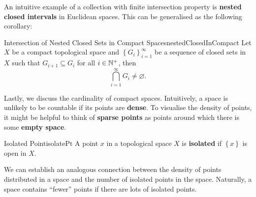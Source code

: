 \documentclass[math]{amznotes}
\theoremstyle{remark}
\begin{document}
An intuitive example of a collection with finite intersection property is \textbf{nested closed intervals} in Euclidean spaces. This can be generalised as the following corollary:
\begin{corbox}{Intersection of Nested Closed Sets in Compact Spaces}{nestedClosedInCompact}
    Let $X$ be a compact topological space and $\left\{G_i\right\}_{i = 1}^{\infty}$ be a sequence of closed sets in $X$ such that $G_{i + 1} \subseteq G_i$ for all $i \in \mathbb{N}^+$, then 
    \begin{equation*}
        \bigcap_{i = 1}^{\infty}G_i \neq \varnothing.
    \end{equation*}
\end{corbox}
Lastly, we discuss the cardinality of compact spaces. Intuitively, a space is unlikely to be countable if its points are \textbf{dense}. To visualise the density of points, it might be helpful to think of \textbf{sparse points} as points around which there is some \textbf{empty space}.
\begin{dfnbox}{Isolated Point}{isolatePt}
    A point $x$ in a topological space $X$ is {\color{red} \textbf{isolated}} if $\left\{x\right\}$ is open in $X$.
\end{dfnbox}
We can establish an analogous connection between the density of points distributed in a space and the number of isolated points in the space. Naturally, a space contains ``fewer'' points if there are lots of isolated points.
\end{document}
